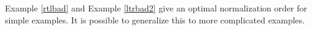 \documentclass[11pt]{article} %
\theoremstyle{definition}
\newtheorem{theorem}{Theorem}[section]
\theoremstyle{definition}
\theoremstyle{definition}
\newtheorem{lemma}{Lemma}[theorem]
\theoremstyle{definition}
\theoremstyle{definition}
\theoremstyle{definition}
\begin{document}
Example \ref{rtlbad} and Example \ref{ltrbad2} give an optimal normalization order
for simple examples. It is possible to generalize this to more complicated examples.







\end{document}

